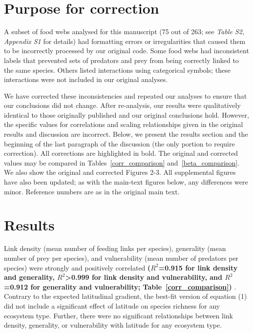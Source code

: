 \documentclass[12pt]{article}
\begin{document}
\begin{spacing}{2.0}

\section*{Purpose for correction}

    A subset of food webs analysed for this manuscript (75 out of 263; see \emph{Table S2, Appendix S1} for details) had formatting errors or irregularities that caused them to be incorrectly processed by our original code. Some food webs had inconsistent labels that prevented sets of predators and prey from being correctly linked to the same species. Others listed interactions using categorical symbols; these interactions were not included in our original analyses.


    We have corrected these inconsistencies and repeated our analyses to ensure that our conclusions did not change. After re-analysis, our results were qualitatively identical to those originally published and our original conclusions hold. However, the specific values for correlations and scaling relationships given in the original results and discussion are incorrect. Below, we present the results section and the beginning of the last paragraph of the discussion (the only portion to require correction). All corrections are highlighted in bold. The original and corrected values may be compared in Tables~\ref{corr_comparison} and~\ref{beta_comparison}. We also show the original and corrected Figures 2-3.  All supplemental figures have also been updated; as with the main-text figures below, any differences were minor. Reference numbers are as in the original main text.


\section*{Results}

    Link density (mean number of feeding links per species), generality (mean
    number of prey per species), and vulnerability (mean number of predators per
    species) were strongly and positively correlated 
    \textbf{($R^2$=0.915 for link
    density and generality, $R^2$\textgreater0.999 for link density and
    vulnerability, and $R^2$=0.912 for generality and vulnerability; Table~\ref{corr_comparison})}
    . Contrary
    to the expected latitudinal gradient, the best-fit version of
    equation (1) did not include a significant
    effect of latitude on species richness for any ecosystem type. Further, there were no significant
    relationships between link density, generality, or vulnerability with
    latitude for any ecosystem type.



\end{spacing}
\end{document}
